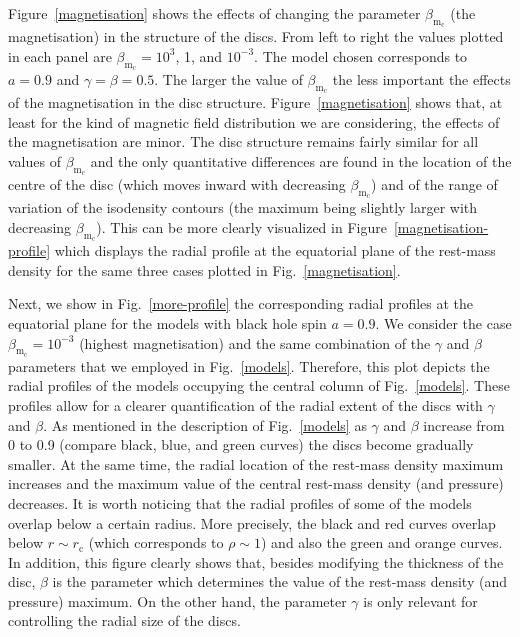 \documentclass{aa}
\begin{document}
Figure~\ref{magnetisation} shows the effects of changing the parameter $\beta_{\mathrm{m}_{\mathrm{c}}}$ (the magnetisation) in the structure of the discs. From left to right the values plotted in each panel are $\beta_{\mathrm{m}_{\mathrm{c}}}=10^3$, 1, and $10^{-3}$. The model chosen corresponds to $a=0.9$ and $\gamma=\beta=0.5$. The larger the value of $\beta_{\mathrm{m}_{\mathrm{c}}}$ the less important the effects of the magnetisation in the disc structure. Figure~\ref{magnetisation} shows that, at least for the kind of magnetic field distribution we are considering, the effects of the magnetisation are minor. The disc structure remains fairly similar for all values of $\beta_{\mathrm{m}_{\mathrm{c}}}
$ and the only quantitative differences are found in the location of the centre of the disc (which moves inward with decreasing $\beta_{\mathrm{m}_{\mathrm{c}}}$) and of the range of variation of the isodensity contours (the maximum being slightly larger with decreasing $\beta_{\mathrm{m}_{\mathrm{c}}}$). This can be more clearly visualized in Figure~\ref{magnetisation-profile} which displays the radial profile at the equatorial plane of the rest-mass density for the same three cases plotted in Fig.~\ref{magnetisation}.

Next, we show in Fig.~\ref{more-profile} the corresponding radial profiles at the equatorial plane for the models with black hole spin $a=0.9$. We consider the case $\beta_{\mathrm{m}_{\mathrm{c}}}=10^{-3}$ (highest magnetisation) and the same combination of the $\gamma$ and $\beta$ parameters that we employed in Fig.~\ref{models}. Therefore, this plot depicts the radial profiles of the models occupying the central column of Fig.~\ref{models}. These profiles allow for a clearer quantification of the radial extent of the discs with $\gamma$ and $\beta$. As mentioned in the description of Fig.~\ref{models} as $\gamma$ and $\beta$ increase from 0 to 0.9 (compare black, blue, and green curves) the discs become gradually smaller. At the same time, the radial location of the rest-mass density maximum increases and the maximum value of the central rest-mass density (and pressure) decreases. It is worth noticing that the radial profiles of some of the models overlap below a certain radius. More precisely, the black and red curves overlap below $r\sim r_{\mathrm{c}}$ (which corresponds to $\rho \sim 1$) and also the green and orange curves. In addition, this figure clearly shows that, besides modifying the thickness of the disc, $\beta$ is the parameter which determines the value of the rest-mass density (and pressure) maximum. On the other hand, the parameter $\gamma$ is only relevant for controlling the radial size of the discs.
\end{document}
